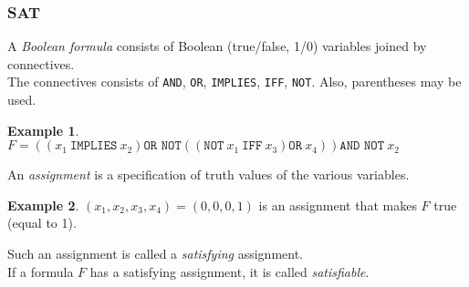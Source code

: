 \documentclass[12pt]{article}
\theoremstyle{plain}
\theoremstyle{definition}
\newtheorem*{ex*}{Example}
\newcommand{\lecture}[1]{\marginpar{{\footnotesize $\leftarrow$ \underline{#1}}}}
\begin{document}
\subsubsection{SAT}
\lecture{2016/11/24}
A \emph{Boolean formula} consists of Boolean (true/false, 1/0) variables joined by connectives. \\
The connectives consists of \texttt{AND}, \texttt{OR}, \texttt{IMPLIES}, \texttt{IFF}, \texttt{NOT}.
Also, parentheses may be used.

\begin{ex*}
  $F = \left(\left(x_{1}~\texttt{IMPLIES}~x_{2}\right)\texttt{OR NOT}\left(\left(\texttt{NOT}~x_{1}~\texttt{IFF}~x_{3}\right)\texttt{OR}~x_{4}\right)\right)\texttt{AND NOT}~x_{2}$
\end{ex*}

An \emph{assignment} is a specification of truth values of the various variables.

\begin{ex*}
$(x_{1}, x_{2}, x_{3}, x_{4}) = (0, 0, 0, 1)$ is an assignment that makes $F$ true (equal to 1).
\end{ex*}

Such an assignment is called a \emph{satisfying} assignment. \\
If a formula $F$ has a satisfying assignment, it is called \emph{satisfiable}. \\
\end{document}
